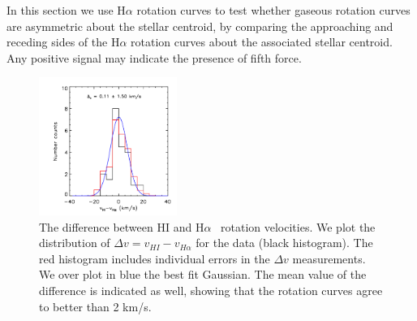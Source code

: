 \documentclass[twocolappendix, numberedappendix]{emulateapj}
\newcommand{\ha}{H$\alpha$}
\begin{document}
In this section we use \ha{} rotation curves to test
whether gaseous rotation curves are asymmetric about the stellar centroid,
by comparing the approaching and receding sides of the \ha{} rotation curves
about the associated stellar centroid. Any
positive signal may indicate the presence of fifth force.

\begin{figure}
\begin{center}
\includegraphics[trim= 0cm 0cm 0cm 0cm, clip = true,
width=0.4\textwidth]{figures/vivalpha.png}
\caption{The difference between HI and \ha~ rotation velocities.
We plot the distribution of $\Delta {v}=v_{HI}-v_{H\alpha}$ for the 
\citet{Swaters2009} data (black histogram). The red histogram includes 
individual errors in the $\Delta v$ measurements. We over plot in
blue the best fit Gaussian. The mean value of the difference is indicated as well, showing that the 
rotation curves agree
to better than 2 km/s.}
\label{h1-ha-rot}
\end{center}
\end{figure}
\end{document}
